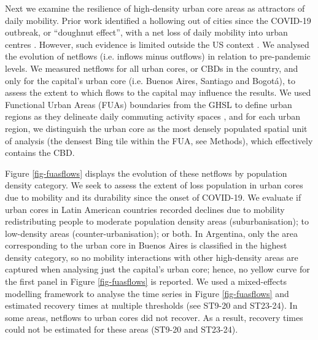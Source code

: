 \documentclass[fleqn,10pt]{wlscirep}
\begin{document}
Next we examine the resilience of high-density urban core areas as attractors of daily mobility. Prior work identified a hollowing out of cities since the COVID-19 outbreak, or ``doughnut effect'', with a net loss of daily mobility into urban centres \cite{ramani2024working}. However, such evidence is limited outside the US context \cite{ramani2024working, gonzalez2023donut}. We analysed the evolution of netflows (i.e. inflows minus outflows) in relation to pre-pandemic levels. We measured netflows for all urban cores, or CBDs in the country, and only for the capital's urban core (i.e. Buenos Aires, Santiago and Bogotá), to assess the extent to which flows to the capital may influence the results. We used Functional Urban Areas (FUAs) boundaries from the GHSL to define urban regions as they delineate daily commuting activity spaces \cite{ceu.jrc.2019}, and for each urban region, we distinguish the urban core as the most densely populated spatial unit of analysis (the densest Bing tile within the FUA, see Methods), which effectively contains the CBD. %

Figure \ref{fig-fuasflows} displays the evolution of these netflows by population density category. We seek to assess the extent of loss population in urban cores due to mobility and its durability since the onset of COVID-19. We evaluate if urban cores in Latin American countries recorded declines due to mobility redistributing people to moderate population density areas (suburbanisation); to low-density areas (counter-urbanisation); or both. In Argentina, only the area corresponding to the urban core in Buenos Aires is classified in the highest density category, so no mobility interactions with other high-density areas are captured when analysing just the capital's urban core; hence, no yellow curve for the first panel in Figure \ref{fig-fuasflows} is reported. We used a mixed-effects modelling framework to analyse the time series in Figure \ref{fig-fuasflows} and estimated recovery times at multiple thresholds (see ST9-20 and ST23-24). In some areas, netflows to urban cores did not recover. As a result, recovery times could not be estimated for these areas (ST9-20 and ST23-24).

\end{document}
